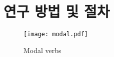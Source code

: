 \documentclass[10pt]{article}
\begin{document}
\section{연구 방법 및 절차}
\lipsum[2]
\begin{figure}
	\centering
	\texttt{[image: modal.pdf]}
	\caption{Modal verbs}
	\label{modal_verbs}
\end{figure}
\begin{thebibliography}{00}
\end{thebibliography}
\end{document}
